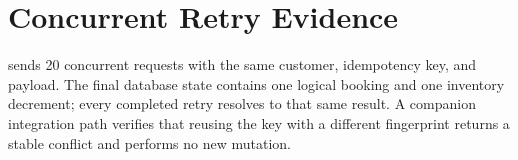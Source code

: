 \section{Concurrent Retry Evidence}
 sends 20 concurrent requests with the same customer,
idempotency key, and payload. The final database state contains one logical
booking and one inventory decrement; every completed retry resolves to that
same result. A companion integration path verifies that reusing the key with a
different fingerprint returns a stable conflict and performs no new mutation.
